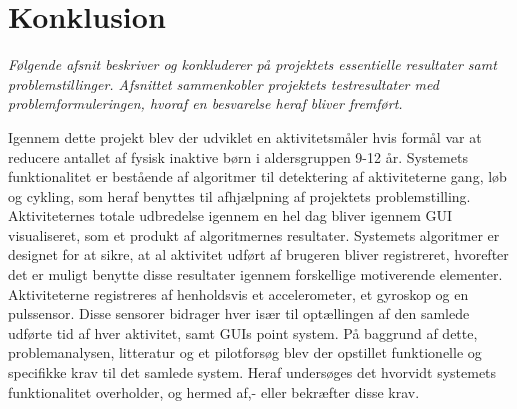 \section{Konklusion}
\textit{Følgende afsnit beskriver og konkluderer på projektets essentielle resultater samt problemstillinger. Afsnittet sammenkobler projektets testresultater med problemformuleringen, hvoraf en besvarelse heraf bliver fremført.}

Igennem dette projekt blev der udviklet en aktivitetsmåler hvis formål var at reducere antallet af fysisk inaktive børn i aldersgruppen 9-12 år. Systemets funktionalitet er bestående af algoritmer til detektering af aktiviteterne gang, løb og cykling, som heraf benyttes til afhjælpning af projektets problemstilling. Aktiviteternes totale udbredelse igennem en hel dag bliver igennem GUI visualiseret, som et produkt af algoritmernes resultater. Systemets algoritmer er designet for at sikre, at al aktivitet udført af brugeren bliver registreret, hvorefter det er muligt benytte disse resultater igennem forskellige motiverende elementer. Aktiviteterne registreres af henholdsvis et accelerometer, et gyroskop og en pulssensor. Disse sensorer bidrager hver især til optællingen af den samlede udførte tid af hver aktivitet, samt GUIs point system. På baggrund af dette, problemanalysen, litteratur og et pilotforsøg blev der opstillet funktionelle og specifikke krav til det samlede system. Heraf undersøges det hvorvidt systemets funktionalitet overholder, og hermed af,- eller bekræfter disse krav. 

